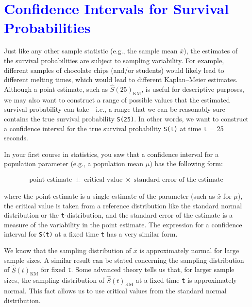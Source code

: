 \documentclass[
]{report}
\begin{document}
\hypertarget{section-81}{%
\section{\texorpdfstring{\textcolor{blue}{Confidence Intervals for Survival Probabilities}}{}}\label{section-81}}

Just like any other sample statistic (e.g., the sample mean \(\scriptstyle \bar x\)), the estimates of the survival probabilities are subject to sampling variability. For example, different samples of chocolate chips (and/or students) would likely lead to different melting times, which would lead to different Kaplan--Meier estimates. Although a point estimate, such as \(\scriptstyle \hat S(25)_{\mathrm{KM}}\), is useful for descriptive purposes, we may also want to construct a range of possible values that the estimated survival probability can take---i.e., a range that we can be reasonably sure contains the true survival probability \texttt{S(25)}. In other words, we want to construct a confidence interval for the true survival probability \texttt{S(t)} at time \texttt{t} = 25 seconds.

In your first course in statistics, you saw that a confidence interval for a population parameter (e.g., a population mean \(\scriptstyle \mu\)) has the following form:

\begin{align}\label{9.6}
\text{point estimate} \;\pm\; \text{critical value}\;\times\;\text{standard error of the estimate}
\tag{7.6}
\end{align}

where the point estimate is a single estimate of the parameter (such as \(\scriptstyle \bar x\) for \(\scriptstyle \mu\)), the critical value is taken from a reference distribution like the standard normal distribution or the \texttt{t}-distribution, and the standard error of the estimate is a measure of the variability in the point estimate. The expression for a confidence interval for \texttt{S(t)} at a fixed time \texttt{t} has a very similar form.

We know that the sampling distribution of \(\scriptstyle \bar x\) is approximately normal for large sample sizes. A similar result can be stated concerning the sampling distribution of \(\scriptstyle \hat S(t)_{\mathrm{KM}}\) for fixed \texttt{t}. Some advanced theory tells us that, for larger sample sizes, the sampling distribution of \(\scriptstyle \hat S(t)_{\mathrm{KM}}\) at a fixed time \texttt{t} is approximately normal. This fact allows us to use critical values from the standard normal distribution.
\end{document}
